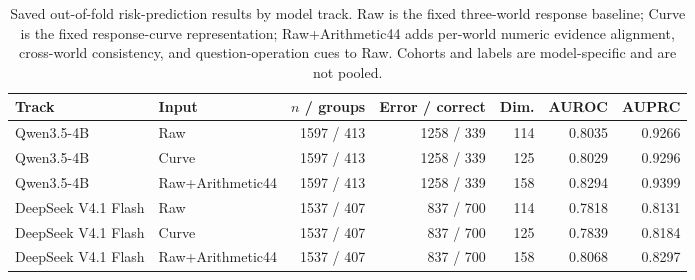 \begin{table}[t]
\centering
\small
\begin{tabular}{llrrrrr}
\toprule
Track & Input & $n$ / groups & Error / correct & Dim. & AUROC & AUPRC \\
\midrule
Qwen3.5-4B & Raw & 1597 / 413 & 1258 / 339 & 114 & 0.8035 & 0.9266 \\
Qwen3.5-4B & Curve & 1597 / 413 & 1258 / 339 & 125 & 0.8029 & 0.9296 \\
Qwen3.5-4B & Raw+Arithmetic44 & 1597 / 413 & 1258 / 339 & 158 & 0.8294 & 0.9399 \\
\midrule
DeepSeek V4.1 Flash & Raw & 1537 / 407 & 837 / 700 & 114 & 0.7818 & 0.8131 \\
DeepSeek V4.1 Flash & Curve & 1537 / 407 & 837 / 700 & 125 & 0.7839 & 0.8184 \\
DeepSeek V4.1 Flash & Raw+Arithmetic44 & 1537 / 407 & 837 / 700 & 158 & 0.8068 & 0.8297 \\
\bottomrule
\end{tabular}
\caption{Saved out-of-fold risk-prediction results by model track. Raw is the fixed three-world response baseline; Curve is the fixed response-curve representation; Raw+Arithmetic44 adds per-world numeric evidence alignment, cross-world consistency, and question-operation cues to Raw. Cohorts and labels are model-specific and are not pooled.}
\label{tab:pecr-two-track-primary}
\end{table}
